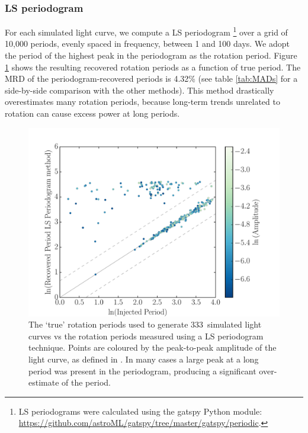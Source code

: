 \documentclass[useAMS, usenatbib, preprint, 12pt]{aastex}
\newcommand{\naigrain}{333}
\newcommand{\percentpgramMAD}{4.32}
\begin{document}
\subsubsection{LS periodogram}
\label{sec:ls}

For each simulated light curve, we compute a LS periodogram
\footnote{LS periodograms were calculated using the gatspy Python module:
\url{https://github.com/astroML/gatspy/tree/master/gatspy/periodic}.}
over a grid of 10,000 periods, evenly spaced in frequency,
between 1 and 100 days.
We adopt the period of the highest peak in the periodogram as the rotation
period.
Figure \ref{fig:pgram_compare} shows the resulting recovered rotation periods
as a function of true period.
The MRD of the periodogram-recovered periods is \percentpgramMAD\% (see table
\ref{tab:MADs} for a side-by-side comparison with the other methods).
This method drastically overestimates many rotation periods,
because long-term trends unrelated to rotation can cause excess power
at long periods.

\begin{figure}
\begin{center}
\includegraphics[width=6in, clip=true]{figures/compare_pgram.pdf}
\caption[LS periodogram results.]
{The `true' rotation periods used to generate \naigrain\ simulated light
curves vs the rotation periods measured using a LS periodogram technique.
    Points are coloured by the peak-to-peak amplitude of the light curve, as
    defined in \citet{Aigrain2015}.
In many cases a large peak at a long period was present in the periodogram,
    producing a significant over-estimate of the period.
    }
\label{fig:pgram_compare}
\end{center}
\end{figure}
\end{document}
